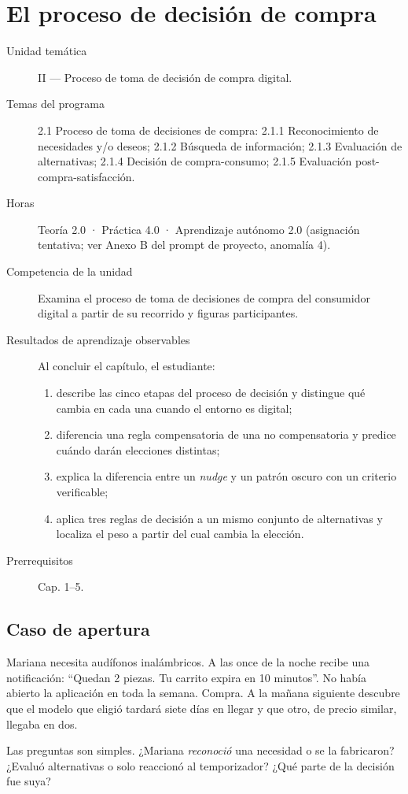\chapter{El proceso de decisión de compra}
\label{cap:06}

\begin{cajaFicha}
\begin{description}
  \item[Unidad temática] II — Proceso de toma de decisión de compra digital.
  \item[Temas del programa] 2.1 Proceso de toma de decisiones de compra: 2.1.1 Reconocimiento de necesidades y/o deseos; 2.1.2 Búsqueda de información; 2.1.3 Evaluación de alternativas; 2.1.4 Decisión de compra-consumo; 2.1.5 Evaluación post-compra-satisfacción.
  \item[Horas] Teoría 2.0 · Práctica 4.0 · Aprendizaje autónomo 2.0 (asignación tentativa; ver Anexo B del prompt de proyecto, anomalía 4).
  \item[Competencia de la unidad] Examina el proceso de toma de decisiones de compra del consumidor digital a partir de su recorrido y figuras participantes.
  \item[Resultados de aprendizaje observables] Al concluir el capítulo, el estudiante:
  \begin{enumerate}
    \item describe las cinco etapas del proceso de decisión y distingue qué cambia en cada una cuando el entorno es digital;
    \item diferencia una regla compensatoria de una no compensatoria y predice cuándo darán elecciones distintas;
    \item explica la diferencia entre un \textit{nudge} y un patrón oscuro con un criterio verificable;
    \item aplica tres reglas de decisión a un mismo conjunto de alternativas y localiza el peso a partir del cual cambia la elección.
  \end{enumerate}
  \item[Prerrequisitos] Cap. 1--5.
\end{description}
\end{cajaFicha}

\section{Caso de apertura}

\begin{casoFicticio}
Mariana necesita audífonos inalámbricos. A las once de la noche recibe una
notificación: \enquote{Quedan 2 piezas. Tu carrito expira en 10 minutos}.
No había abierto la aplicación en toda la semana. Compra. A la mañana
siguiente descubre que el modelo que eligió tardará siete días en llegar y
que otro, de precio similar, llegaba en dos.

Las preguntas son simples. ¿Mariana \emph{reconoció} una necesidad o se la
fabricaron? ¿Evaluó alternativas o solo reaccionó al temporizador? ¿Qué parte
de la decisión fue suya?
\end{casoFicticio}

